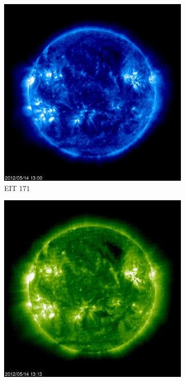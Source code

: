 \documentclass{article}
\begin{document}
\begin{figure}[h!tb]
	\centering
	\begin{subfigure}[b]{0.16\textwidth}
		\includegraphics[width=\textwidth]{Figures/SOHOEIT171.jpg}
		\caption{EIT 171}
		\label{fig:SOHOEIT171}
	\end{subfigure}
	\begin{subfigure}[b]{0.16\linewidth}
		\includegraphics[width=\textwidth]{Figures/SOHOEIT195.jpg}

\end{subfigure}
\end{figure}
\end{document}

